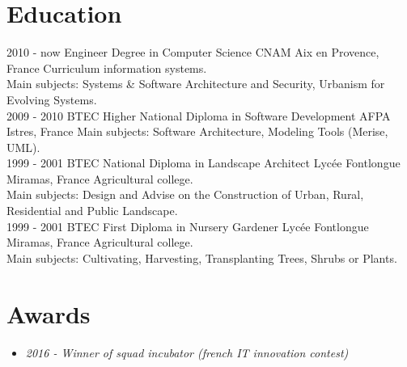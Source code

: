 \documentclass[]{friggeri-cv}
\begin{document}
\section{Education}
\begin{entrylist}
    \entry
        {2010 - now}
        {Engineer Degree in Computer Science}
        {CNAM Aix en Provence, France}
        {Curriculum information systems.\\
        Main subjects: Systems \& Software Architecture and Security, Urbanism for Evolving Systems.\\}
    \entry
        {2009 - 2010}
        {BTEC Higher National Diploma in Software Development}
        {AFPA Istres, France}
        {Main subjects: Software Architecture, Modeling Tools (Merise, UML).\\}
    \entry
        {1999 - 2001}
        {BTEC National Diploma in Landscape Architect}
        {Lycée Fontlongue Miramas, France}
        {Agricultural college.\\
        Main subjects: Design and Advise on the Construction of Urban, Rural, Residential and Public Landscape.\\}
    \entry
        {1999 - 2001}
        {BTEC First Diploma in Nursery Gardener}
        {Lycée Fontlongue Miramas, France}
        {Agricultural college.\\
        Main subjects: Cultivating, Harvesting, Transplanting Trees, Shrubs or Plants.}
\end{entrylist}

\section{Awards}
\begin {itemize}
    \item \emph {2016 - Winner of squad incubator (french IT innovation contest)}
\end {itemize}

\newpage
\end{document}
